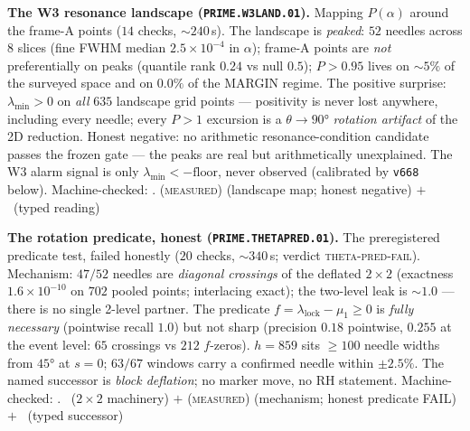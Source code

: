 \par\smallskip\noindent\textbf{The W3 resonance landscape
(\texttt{PRIME.W3LAND.01}).}
Mapping $P(\alpha)$ around the frame-A points ($14$ checks,
${\sim}240$\,s).  The landscape is \emph{peaked}: $52$ needles
across $8$ slices (fine FWHM median $2.5\times10^{-4}$ in $\alpha$);
frame-A points are \emph{not} preferentially on peaks (quantile rank
$0.24$ vs null $0.5$); $P>0.95$ lives on ${\sim}5\%$ of the surveyed
space and on $0.0\%$ of the MARGIN regime.  The positive surprise:
$\lambda_{\min}>0$ on \emph{all} $635$ landscape grid points ---
positivity is never lost anywhere, including every needle; every
$P>1$ excursion is a $\theta\to90°$ \emph{rotation artifact} of the
2D reduction.  Honest negative: no arithmetic resonance-condition
candidate passes the frozen gate --- the peaks are real but
arithmetically unexplained.  The W3 alarm signal is only
$\lambda_{\min}<-\mathrm{floor}$, never observed (calibrated by
\texttt{v668} below).
Machine-checked: .
(\textsc{measured}) (landscape map; honest negative) $+$ \mC\ (typed
reading)
\par\smallskip


\par\smallskip\noindent\textbf{The rotation predicate, honest
(\texttt{PRIME.THETAPRED.01}).}
The preregistered predicate test, failed honestly ($20$ checks,
${\sim}340$\,s; verdict \textsc{theta-pred-fail}).  Mechanism:
$47/52$ needles are \emph{diagonal crossings} of the deflated
$2\times2$ (exactness $1.6\times10^{-10}$ on $702$ pooled points;
interlacing exact); the two-level leak is ${\sim}1.0$ --- there is
no single 2-level partner.  The predicate
$f=\lambda_{\mathrm{lock}}-\mu_1\ge0$ is \emph{fully necessary}
(pointwise recall $1.0$) but not sharp (precision $0.18$ pointwise,
$0.255$ at the event level: $65$ crossings vs $212$ $f$-zeros).
$h=859$ sits $\ge100$ needle widths from $45°$ at $s=0$; $63/67$
windows carry a confirmed needle within $\pm2.5\%$.  The named
successor is \emph{block deflation}; no marker move, no RH
statement.
Machine-checked: .
\mE\ ($2\times2$ machinery) $+$ (\textsc{measured}) (mechanism;
honest predicate FAIL) $+$ \mC\ (typed successor)
\par\smallskip


